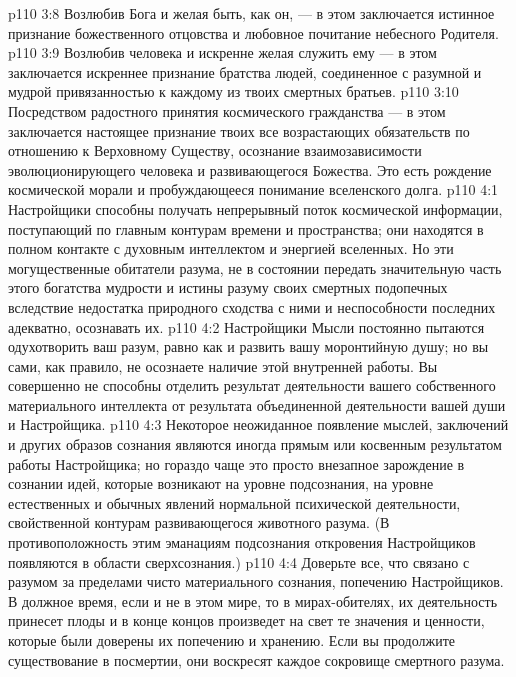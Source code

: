 \vs p110 3:8 \pc {}\bibnobreakspace Возлюбив Бога и желая быть, как он, --- в этом заключается истинное признание божественного отцовства и любовное почитание небесного Родителя.
\vs p110 3:9 \pc {}\bibnobreakspace Возлюбив человека и искренне желая служить ему --- в этом заключается искреннее признание братства людей, соединенное с разумной и мудрой привязанностью к каждому из твоих смертных братьев.
\vs p110 3:10 \pc {}\bibnobreakspace Посредством радостного принятия космического гражданства --- в этом заключается настоящее признание твоих все возрастающих обязательств по отношению к Верховному Существу, осознание взаимозависимости эволюционирующего человека и развивающегося Божества. Это есть рождение космической морали и пробуждающееся понимание вселенского долга.
\vs p110 4:1 Настройщики способны получать непрерывный поток космической информации, поступающий по главным контурам времени и пространства; они находятся в полном контакте с духовным интеллектом и энергией вселенных. Но эти могущественные обитатели разума, не в состоянии передать значительную часть этого богатства мудрости и истины разуму своих смертных подопечных вследствие недостатка природного сходства с ними и неспособности последних адекватно, осознавать их.
\vs p110 4:2 Настройщики Мысли постоянно пытаются одухотворить ваш разум, равно как и развить вашу моронтийную душу; но вы сами, как правило, не осознаете наличие этой внутренней работы. Вы совершенно не способны отделить результат деятельности вашего собственного материального интеллекта от результата объединенной деятельности вашей души и Настройщика.
\vs p110 4:3 Некоторое неожиданное появление мыслей, заключений и других образов сознания являются иногда прямым или косвенным результатом работы Настройщика; но гораздо чаще это просто внезапное зарождение в сознании идей, которые возникают на уровне подсознания, на уровне естественных и обычных явлений нормальной психической деятельности, свойственной контурам развивающегося животного разума. (В противоположность этим эманациям подсознания откровения Настройщиков появляются в области сверхсознания.)
\vs p110 4:4 Доверьте все, что связано с разумом за пределами чисто материального сознания, попечению Настройщиков. В должное время, если и не в этом мире, то в мирах\hyp{}обителях, их деятельность принесет плоды и в конце концов произведет на свет те значения и ценности, которые были доверены их попечению и хранению. Если вы продолжите существование в посмертии, они воскресят каждое сокровище смертного разума.
